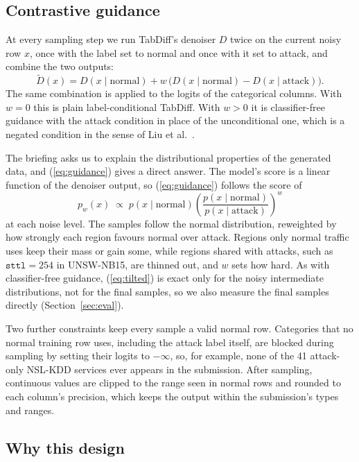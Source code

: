\documentclass[11pt,a4paper]{article}
\newcommand{\col}[1]{\texttt{#1}}
\begin{document}
\subsection{Contrastive guidance}

At every sampling step we run TabDiff's denoiser $D$ twice on the current noisy row $x$, once with the label set to normal and once with it set to attack, and combine the two outputs:
\begin{equation}
\tilde{D}(x) = D(x \mid \text{normal}) + w\,\bigl(D(x \mid \text{normal}) - D(x \mid \text{attack})\bigr).
\label{eq:guidance}
\end{equation}
The same combination is applied to the logits of the categorical columns. With $w=0$ this is plain label-conditional TabDiff. With $w>0$ it is classifier-free guidance with the attack condition in place of the unconditional one, which is a negated condition in the sense of Liu et al.~\cite{liu2022composable}.

The briefing asks us to explain the distributional properties of the generated data, and (\ref{eq:guidance}) gives a direct answer. The model's score is a linear function of the denoiser output, so (\ref{eq:guidance}) follows the score of
\begin{equation}
p_w(x) \;\propto\; p(x \mid \text{normal}) \left( \frac{p(x \mid \text{normal})}{p(x \mid \text{attack})} \right)^{w}
\label{eq:tilted}
\end{equation}
at each noise level. The samples follow the normal distribution, reweighted by how strongly each region favours normal over attack. Regions only normal traffic uses keep their mass or gain some, while regions shared with attacks, such as $\col{sttl}=254$ in UNSW-NB15, are thinned out, and $w$ sets how hard. As with classifier-free guidance, (\ref{eq:tilted}) is exact only for the noisy intermediate distributions, not for the final samples, so we also measure the final samples directly (Section~\ref{sec:eval}).

Two further constraints keep every sample a valid normal row. Categories that no normal training row uses, including the attack label itself, are blocked during sampling by setting their logits to $-\infty$, so, for example, none of the 41 attack-only NSL-KDD services ever appears in the submission. After sampling, continuous values are clipped to the range seen in normal rows and rounded to each column's precision, which keeps the output within the submission's types and ranges.

\subsection{Why this design}
\end{document}
